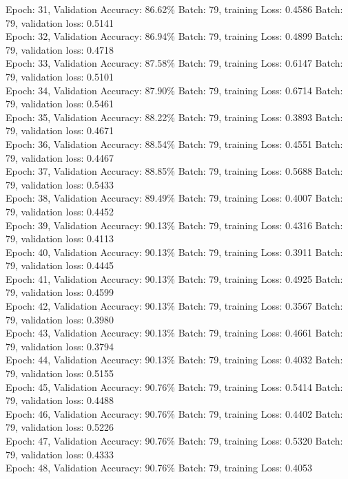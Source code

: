 \documentclass[11pt]{article}
\begin{document}
Epoch: 31, Validation Accuracy: 86.62\%
Batch: 79, training Loss: 0.4586
Batch: 79, validation loss: 0.5141\\
Epoch: 32, Validation Accuracy: 86.94\%
Batch: 79, training Loss: 0.4899
Batch: 79, validation loss: 0.4718\\
Epoch: 33, Validation Accuracy: 87.58\%
Batch: 79, training Loss: 0.6147
Batch: 79, validation loss: 0.5101\\
Epoch: 34, Validation Accuracy: 87.90\%
Batch: 79, training Loss: 0.6714
Batch: 79, validation loss: 0.5461\\
Epoch: 35, Validation Accuracy: 88.22\%
Batch: 79, training Loss: 0.3893
Batch: 79, validation loss: 0.4671\\
Epoch: 36, Validation Accuracy: 88.54\%
Batch: 79, training Loss: 0.4551
Batch: 79, validation loss: 0.4467\\
Epoch: 37, Validation Accuracy: 88.85\%
Batch: 79, training Loss: 0.5688
Batch: 79, validation loss: 0.5433\\
Epoch: 38, Validation Accuracy: 89.49\%
Batch: 79, training Loss: 0.4007
Batch: 79, validation loss: 0.4452\\
Epoch: 39, Validation Accuracy: 90.13\%
Batch: 79, training Loss: 0.4316
Batch: 79, validation loss: 0.4113\\
Epoch: 40, Validation Accuracy: 90.13\%
Batch: 79, training Loss: 0.3911
Batch: 79, validation loss: 0.4445\\
Epoch: 41, Validation Accuracy: 90.13\%
Batch: 79, training Loss: 0.4925
Batch: 79, validation loss: 0.4599\\
Epoch: 42, Validation Accuracy: 90.13\%
Batch: 79, training Loss: 0.3567
Batch: 79, validation loss: 0.3980\\
Epoch: 43, Validation Accuracy: 90.13\%
Batch: 79, training Loss: 0.4661
Batch: 79, validation loss: 0.3794\\
Epoch: 44, Validation Accuracy: 90.13\%
Batch: 79, training Loss: 0.4032
Batch: 79, validation loss: 0.5155\\
Epoch: 45, Validation Accuracy: 90.76\%
Batch: 79, training Loss: 0.5414
Batch: 79, validation loss: 0.4488\\
Epoch: 46, Validation Accuracy: 90.76\%
Batch: 79, training Loss: 0.4402
Batch: 79, validation loss: 0.5226\\
Epoch: 47, Validation Accuracy: 90.76\%
Batch: 79, training Loss: 0.5320
Batch: 79, validation loss: 0.4333\\
Epoch: 48, Validation Accuracy: 90.76\%
Batch: 79, training Loss: 0.4053
\end{document}

